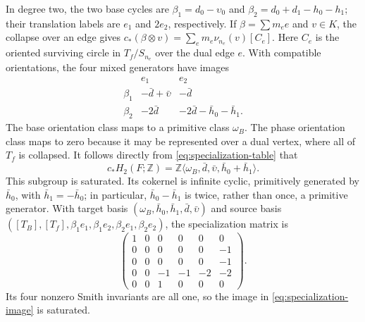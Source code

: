 \documentclass[11pt]{article}
\theoremstyle{definition}
\theoremstyle{remark}
\numberwithin{equation}{section}
\begin{document}
In degree two, the two
base cycles are $\beta_1=d_0-\upsilon_0$ and
$\beta_2=d_0+d_1-h_0-h_1$; their translation labels are
$e_1$ and $2e_2$, respectively.  If
$\beta=\sum m_e e$ and $v\in K$, the collapse over an edge gives
$c_*(\beta\otimes v)=\sum_e m_e\nu_{n_e}(v)[C_e]$.
Here $C_e$ is the oriented surviving circle in $T_f/S_{n_e}$ over the
dual edge $e$.
With compatible orientations, the four mixed generators have images
\begin{equation}\label{eq:specialization-table}
\begin{array}{c|cc}
 &e_1&e_2\\ \hline
\beta_1&-\bar d+\bar\upsilon&-\bar d\\
\beta_2&-2\bar d&-2\bar d-\bar h_0-\bar h_1.
\end{array}
\end{equation}
The base orientation class maps to a primitive class $\omega_B$.  The phase
orientation class maps to zero because it may be represented over a dual
vertex, where all of $T_f$ is collapsed.  It follows directly from
\eqref{eq:specialization-table} that
\begin{equation}\label{eq:specialization-image}
 c_*H_2(F;\mathbb Z)
 =\mathbb Z\langle\omega_B,\bar d,\bar\upsilon,
                  \bar h_0+\bar h_1\rangle.
\end{equation}
This subgroup is saturated.  Its cokernel is infinite cyclic, primitively
generated by $\bar h_0$, with $\bar h_1=-\bar h_0$; in particular,
$\bar h_0-\bar h_1$ is twice, rather than once, a primitive generator.
With target basis
$(\omega_B,\bar h_0,\bar h_1,\bar d,\bar\upsilon)$ and source basis
$([T_B],[T_f],\beta_1e_1,\beta_1e_2,\beta_2e_1,\beta_2e_2)$, the
specialization matrix is
\begin{equation*}
 \begin{pmatrix}
 1&0& 0& 0& 0& 0\\
 0&0& 0& 0& 0&-1\\
 0&0& 0& 0& 0&-1\\
 0&0&-1&-1&-2&-2\\
 0&0& 1& 0& 0& 0
 \end{pmatrix}.
\end{equation*}
Its four nonzero Smith invariants are all one, so the image in
\eqref{eq:specialization-image} is saturated.
\end{document}
